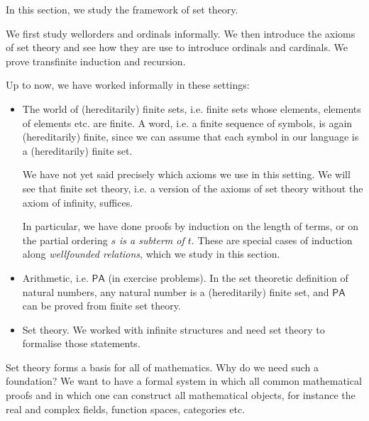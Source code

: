 \documentclass[a4paper, 11pt]{amsart}
\theoremstyle{remark}
\newcommand{\axiomft}[1]{\mathsf{#1}}
\newcommand{\PA}{\axiomft{PA}}
\begin{document}
In this section, we study the framework of set theory. 

We first study wellorders and ordinals informally. 
We then introduce the axioms of set theory and see how they are use to introduce ordinals and cardinals. 
We prove transfinite induction and recursion. 


Up to now, we have worked informally in these settings: 

\begin{itemize} 
\item 
The world of (hereditarily) finite sets, i.e. finite sets whose elements, elements of elements etc. are finite. 
A word, i.e. a finite sequence of symbols, is again (hereditarily) finite, since we can assume that each symbol in our language is a (hereditarily) finite set. 

We have not yet said precisely which axioms we use in this setting. 
We will see that finite set theory, i.e. a version of the axioms of set theory without the axiom of infinity, suffices. 

In particular, we have done proofs by induction on the length of terms, or on the partial ordering \emph{$s$ is a subterm of $t$}.  
These are special cases of induction along \emph{wellfounded relations}, which we study in this section. 

\item 
Arithmetic, i.e. $\PA$ (in exercise problems). 
In the set theoretic definition of natural numbers, any natural number is a (hereditarily) finite set, and $\PA$ can be proved from finite set theory. 

\item 
Set theory. 
We worked with infinite structures and need set theory to formalise those statements. 

\end{itemize} 



Set theory forms a basis for all of mathematics. 
Why do we need such a foundation? 
We want to have a formal system in which all common mathematical proofs and in which one can construct all mathematical objects, for instance the real and complex fields, function spaces, categories etc. 
\end{document}
